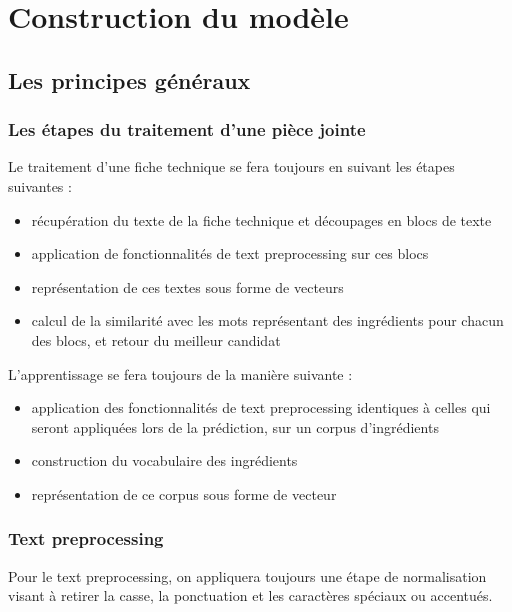 \part{Construction du modèle}
    \chapter{Les principes généraux}
        \section{Les étapes du traitement d'une pièce jointe}

        Le traitement d'une fiche technique se fera toujours en suivant les étapes suivantes : 
        \begin{itemize}
            \item récupération du texte de la fiche technique et découpages en blocs de texte
            \item application de fonctionnalités de text preprocessing sur ces blocs
            \item représentation de ces textes sous forme de vecteurs
            \item calcul de la similarité avec les mots représentant des ingrédients pour chacun des blocs, et retour du meilleur candidat
        \end{itemize}

        L'apprentissage se fera toujours de la manière suivante :
        \begin{itemize}
            \item application des fonctionnalités de text preprocessing identiques à celles qui seront appliquées lors de la prédiction, sur un corpus d'ingrédients
            \item construction du vocabulaire des ingrédients
            \item représentation de ce corpus sous forme de vecteur
        \end{itemize}

        \section{Text preprocessing}

        Pour le text preprocessing, on appliquera toujours une étape de normalisation visant à retirer la casse, la ponctuation et les caractères spéciaux ou accentués.
        
